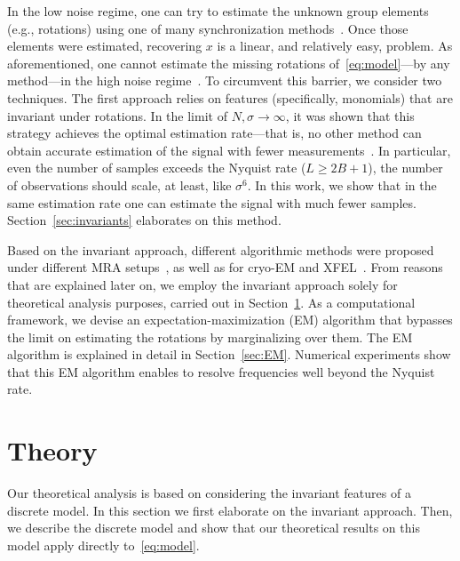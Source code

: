 \documentclass[english,12pt]{article}
\numberwithin{equation}{section}
\numberwithin{thm}{section} %
\begin{document}
In the low noise regime, one can try to estimate the unknown group elements (e.g., rotations) using one of many synchronization methods~\cite{singer2011angular,bandeira2015non,boumal2016nonconvex,chen2018projected,singer2011three}.
Once those elements were estimated, recovering $x$ is a linear, and relatively easy, problem. 
As aforementioned, one cannot estimate the missing rotations of~\eqref{eq:model}---by any method---in the high noise regime~\cite{bendory2018toward,aguerrebere2016fundamental}.
To circumvent this barrier, we  consider two techniques.
The first approach relies on features (specifically, monomials) that are invariant under rotations. In the limit of $N,\sigma\to\infty$, it was shown that this strategy achieves the optimal  estimation rate---that is, no other method can obtain accurate estimation of the signal with fewer measurements~\cite{bandeira2017optimal,bandeira2017estimation,abbe2018multireference,abbe2018estimation}. 
In particular, even the number of samples exceeds the Nyquist rate ($L\geq 2B+1$), the number of observations should scale, at least, like $\sigma^6$. In this work, we show that in the same estimation rate one can estimate the signal with much fewer samples.   
Section~\ref{sec:invariants} elaborates on this method.

Based on the invariant approach, different algorithmic methods were proposed under different MRA setups~\cite{bendory2017bispectrum,perry2017sample,abbe2018multireference,boumal2018heterogeneous,chen2018spectral,ma2018heterogeneous,bandeira2014multireference}, as well as for  cryo-EM and XFEL~\cite{kam1980reconstruction,liu2013three,kurta2017correlations,levin20173d,bendory2018toward,pande2018ab,von2018structure}. 
From reasons that are explained later on, we employ the invariant approach solely for theoretical analysis purposes, carried out in Section~\ref{sec:theory}. As a computational framework, we devise an expectation-maximization (EM) algorithm that bypasses the limit on estimating the rotations by marginalizing over them.  The EM algorithm is explained in detail in Section~\ref{sec:EM}.
Numerical experiments show that this EM algorithm enables to resolve frequencies well beyond the Nyquist rate.

\section{Theory} \label{sec:theory}

Our theoretical analysis is based on considering the invariant features of a discrete model. In this section we first elaborate on the invariant approach. Then, we describe the discrete model and show that our theoretical results on this model apply directly to~\eqref{eq:model}.
\end{document}
